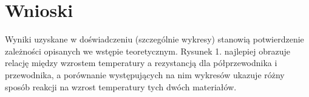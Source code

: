 \documentclass[10pt,a4paper]{article}
\newcommand{\forceindent}{\leavevmode{\parindent=3em\indent}}
\begin{document}
\section*{Wnioski}
\forceindent Wyniki uzyskane w doświadczeniu (szczególnie wykresy) stanowią potwierdzenie zależności opisanych we wstępie teoretycznym.
Rysunek 1. najlepiej obrazuje relację między wzrostem temperatury a rezystancją dla półprzewodnika i przewodnika, a porównanie występujących na nim wykresów ukazuje różny sposób reakcji na wzrost temperatury tych dwóch materiałów.
\end{document}
